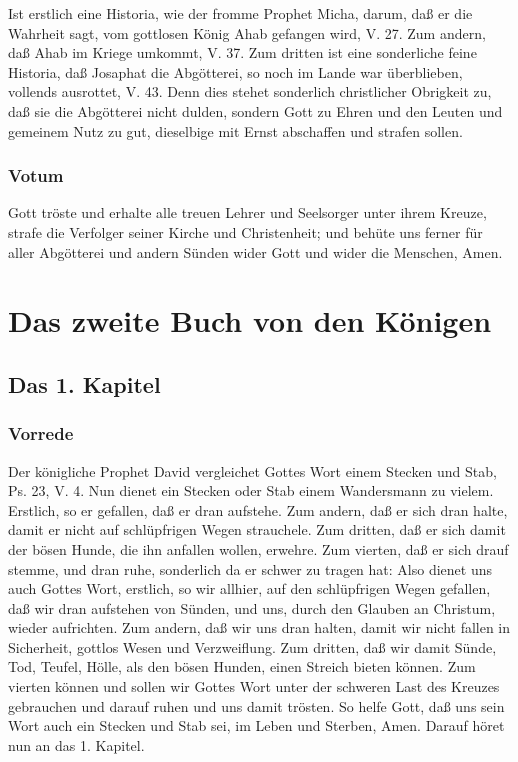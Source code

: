 Ist erstlich eine Historia, wie der fromme Prophet Micha, darum, daß er die Wahrheit sagt, vom gottlosen König Ahab gefangen wird, V. 27. Zum andern, daß Ahab im Kriege umkommt, V. 37. Zum dritten ist eine sonderliche feine Historia, daß Josaphat die Abgötterei, so noch im Lande war überblieben, vollends ausrottet, V. 43. Denn dies stehet sonderlich christlicher Obrigkeit zu, daß sie die Abgötterei nicht dulden, sondern Gott zu Ehren und den Leuten und gemeinem Nutz zu gut, dieselbige mit Ernst abschaffen und strafen sollen.

\section{Votum}

Gott tröste und erhalte alle treuen Lehrer und Seelsorger unter ihrem Kreuze, strafe die Verfolger seiner Kirche und Christenheit; und behüte uns ferner für aller Abgötterei und andern Sünden wider Gott und wider die Menschen, Amen.

\part{Das zweite Buch von den Königen}

\chapter{Das 1. Kapitel}

\section{Vorrede}

Der königliche Prophet David vergleichet Gottes Wort einem Stecken und Stab, Ps. 23, V. 4. Nun dienet ein Stecken oder Stab einem Wandersmann zu vielem. Erstlich, so er gefallen, daß er dran aufstehe. Zum andern, daß er sich dran halte, damit er nicht auf schlüpfrigen Wegen strauchele. Zum dritten, daß er sich damit der bösen Hunde, die ihn anfallen wollen, erwehre. Zum vierten, daß er sich drauf stemme, und dran ruhe, sonderlich da er schwer zu tragen hat: Also dienet uns auch Gottes Wort, erstlich, so wir allhier, auf den schlüpfrigen Wegen gefallen, daß wir dran aufstehen von Sünden, und uns, durch den Glauben an Christum, wieder aufrichten. Zum andern, daß wir uns dran halten, damit wir nicht fallen in Sicherheit, gottlos Wesen und Verzweiflung. Zum dritten, daß wir damit Sünde, Tod, Teufel, Hölle, als den bösen Hunden, einen Streich bieten können. Zum vierten können und sollen wir Gottes Wort unter der schweren Last des Kreuzes gebrauchen und darauf ruhen und uns damit trösten. So helfe Gott, daß uns sein Wort auch ein Stecken und Stab sei, im Leben und Sterben, Amen. Darauf höret nun an das 1. Kapitel.

